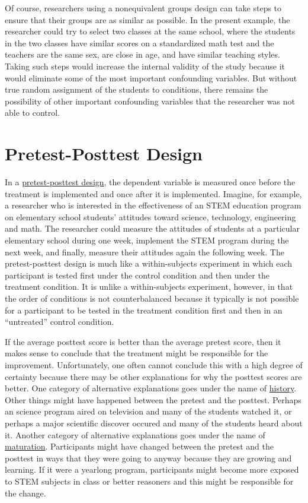 \documentclass[
]{krantz}
\begin{document}
Of course, researchers using a nonequivalent groups design can take steps to ensure that their groups are as similar as possible. In the present example, the researcher could try to select two classes at the same school, where the students in the two classes have similar scores on a standardized math test and the teachers are the same sex, are close in age, and have similar teaching styles. Taking such steps would increase the internal validity of the study because it would eliminate some of the most important confounding variables. But without true random assignment of the students to conditions, there remains the possibility of other important confounding variables that the researcher was not able to control.

\section{Pretest-Posttest Design}\label{pretest-posttest-design}

In a \hyperref[pretest-posttest-design]{pretest-posttest design}, the dependent variable is measured once before the treatment is implemented and once after it is implemented. Imagine, for example, a researcher who is interested in the effectiveness of an STEM education program on elementary school students' attitudes toward science, technology, engineering and math. The researcher could measure the attitudes of students at a particular elementary school during one week, implement the STEM program during the next week, and finally, measure their attitudes again the following week. The pretest-posttest design is much like a within-subjects experiment in which each participant is tested first under the control condition and then under the treatment condition. It is unlike a within-subjects experiment, however, in that the order of conditions is not counterbalanced because it typically is not possible for a participant to be tested in the treatment condition first and then in an ``untreated'' control condition.

If the average posttest score is better than the average pretest score, then it makes sense to conclude that the treatment might be responsible for the improvement. Unfortunately, one often cannot conclude this with a high degree of certainty because there may be other explanations for why the posttest scores are better. One category of alternative explanations goes under the name of \hyperref[history]{history}. Other things might have happened between the pretest and the posttest. Perhaps an science program aired on television and many of the students watched it, or perhaps a major scientific discover occured and many of the students heard about it. Another category of alternative explanations goes under the name of \hyperref[maturation]{maturation}. Participants might have changed between the pretest and the posttest in ways that they were going to anyway because they are growing and learning. If it were a yearlong program, participants might become more exposed to STEM subjects in class or better reasoners and this might be responsible for the change.
\end{document}
